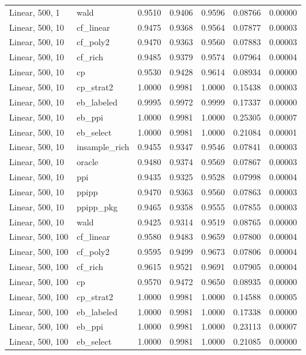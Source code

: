 \begin{longtable}{llrrrrr}
Linear, 500, 1 & wald & 0.9510 & 0.9406 & 0.9596 & 0.08766 & 0.00000 \\
Linear, 500, 10 & cf\_linear & 0.9475 & 0.9368 & 0.9564 & 0.07877 & 0.00003 \\
Linear, 500, 10 & cf\_poly2 & 0.9470 & 0.9363 & 0.9560 & 0.07883 & 0.00003 \\
Linear, 500, 10 & cf\_rich & 0.9485 & 0.9379 & 0.9574 & 0.07964 & 0.00004 \\
Linear, 500, 10 & cp & 0.9530 & 0.9428 & 0.9614 & 0.08934 & 0.00000 \\
Linear, 500, 10 & cp\_strat2 & 1.0000 & 0.9981 & 1.0000 & 0.15438 & 0.00003 \\
Linear, 500, 10 & eb\_labeled & 0.9995 & 0.9972 & 0.9999 & 0.17337 & 0.00000 \\
Linear, 500, 10 & eb\_ppi & 1.0000 & 0.9981 & 1.0000 & 0.25305 & 0.00007 \\
Linear, 500, 10 & eb\_select & 1.0000 & 0.9981 & 1.0000 & 0.21084 & 0.00001 \\
Linear, 500, 10 & insample\_rich & 0.9455 & 0.9347 & 0.9546 & 0.07841 & 0.00003 \\
Linear, 500, 10 & oracle & 0.9480 & 0.9374 & 0.9569 & 0.07867 & 0.00003 \\
Linear, 500, 10 & ppi & 0.9435 & 0.9325 & 0.9528 & 0.07998 & 0.00004 \\
Linear, 500, 10 & ppipp & 0.9470 & 0.9363 & 0.9560 & 0.07863 & 0.00003 \\
Linear, 500, 10 & ppipp\_pkg & 0.9465 & 0.9358 & 0.9555 & 0.07855 & 0.00003 \\
Linear, 500, 10 & wald & 0.9425 & 0.9314 & 0.9519 & 0.08765 & 0.00000 \\
Linear, 500, 100 & cf\_linear & 0.9580 & 0.9483 & 0.9659 & 0.07800 & 0.00004 \\
Linear, 500, 100 & cf\_poly2 & 0.9595 & 0.9499 & 0.9673 & 0.07806 & 0.00004 \\
Linear, 500, 100 & cf\_rich & 0.9615 & 0.9521 & 0.9691 & 0.07905 & 0.00004 \\
Linear, 500, 100 & cp & 0.9570 & 0.9472 & 0.9650 & 0.08935 & 0.00000 \\
Linear, 500, 100 & cp\_strat2 & 1.0000 & 0.9981 & 1.0000 & 0.14588 & 0.00005 \\
Linear, 500, 100 & eb\_labeled & 1.0000 & 0.9981 & 1.0000 & 0.17338 & 0.00000 \\
Linear, 500, 100 & eb\_ppi & 1.0000 & 0.9981 & 1.0000 & 0.23113 & 0.00007 \\
Linear, 500, 100 & eb\_select & 1.0000 & 0.9981 & 1.0000 & 0.21085 & 0.00000 \\

\end{longtable}
